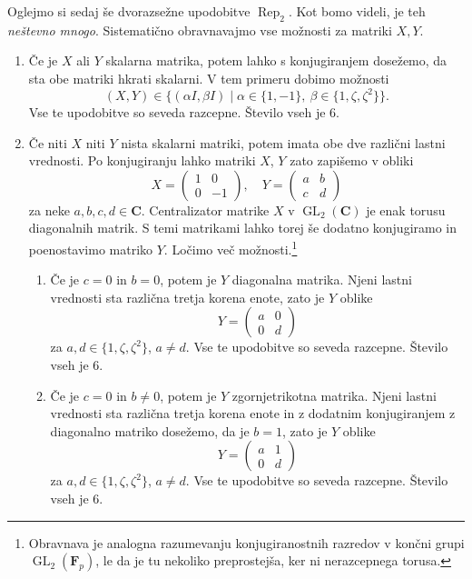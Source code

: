 \documentclass[11pt]{book}
\def\CC{\mathbf{C}}
\def\FF{\mathbf{F}}
\DeclareMathOperator\Rep{Rep}
\DeclareMathOperator\GL{GL}
\theoremstyle{definition}
\theoremstyle{zgled}
\theoremstyle{odprtproblem}
\theoremstyle{domacanaloga}
\theoremstyle{izrek}
\begin{document}
Oglejmo si sedaj še dvorazsežne upodobitve $\Rep_2$. Kot bomo videli, je teh \emph{neštevno mnogo}. Sistematično obravnavajmo vse možnosti za matriki $X,Y$. 

\begin{enumerate}
    \item Če je $X$ ali $Y$ skalarna matrika, potem lahko s konjugiranjem dosežemo, da sta obe matriki hkrati skalarni. V tem primeru dobimo možnosti
    \[
        (X,Y) \in \{ (\alpha I, \beta I) \mid \alpha \in \{ 1, -1 \}, \ \beta \in \{ 1, \zeta, \zeta^2 \} \}.
    \]
    Vse te upodobitve so seveda razcepne. Število vseh je $6$.

    \item Če niti $X$ niti $Y$ nista skalarni matriki, potem imata obe dve različni lastni vrednosti. Po konjugiranju lahko matriki $X$, $Y$ zato zapišemo v obliki
    \[
        X = \begin{pmatrix}
            1 & 0 \\ 0 & -1
        \end{pmatrix}, \quad
        Y = \begin{pmatrix}
            a & b \\ c & d
        \end{pmatrix}
    \]
    za neke $a,b,c,d \in \CC$. Centralizator matrike $X$ v $\GL_2(\CC)$ je enak torusu diagonalnih matrik. S temi matrikami lahko torej še dodatno konjugiramo in poenostavimo matriko $Y$. Ločimo več možnosti.\footnote{Obravnava je analogna razumevanju konjugiranostnih razredov v končni grupi $\GL_2(\FF_p)$, le da je tu nekoliko preprostejša, ker ni nerazcepnega torusa.}
    \begin{enumerate}
        \item Če je $c = 0$ in $b = 0$, potem je $Y$ diagonalna matrika. 
        Njeni lastni vrednosti sta različna tretja korena enote, zato je $Y$ oblike
        \[
            Y = \begin{pmatrix}
                a & 0 \\ 0 & d
            \end{pmatrix}
        \]
        za $a,d\in \{ 1, \zeta, \zeta^2 \}$, $a \neq d$. Vse te upodobitve so seveda razcepne. Število vseh je $6$.
        
        \item Če je $c = 0$ in $b \neq 0$, potem je $Y$ zgornjetrikotna matrika. Njeni lastni vrednosti sta različna tretja korena enote in z dodatnim konjugiranjem z diagonalno matriko dosežemo, da je $b = 1$, zato je $Y$ oblike
        \[
            Y = \begin{pmatrix}
                a & 1 \\ 0 & d
            \end{pmatrix}
        \]
        za $a,d\in \{ 1, \zeta, \zeta^2 \}$, $a \neq d$. Vse te upodobitve so seveda razcepne. Število vseh je $6$.


\end{enumerate}
\end{enumerate}
\end{document}
